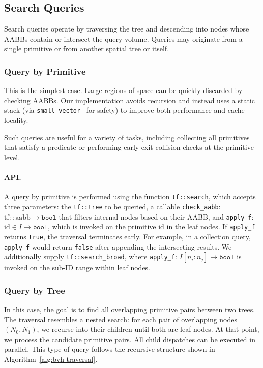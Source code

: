 \subsection{Search Queries}

Search queries operate by traversing the tree and descending
into nodes whose AABBs contain or intersect the query volume.
Queries may originate from a single primitive or from another
spatial tree or itself.

\subsubsection{Query by Primitive}
This is the simplest case. Large regions of space can be
quickly discarded by checking AABBs. Our implementation avoids
recursion and instead uses a static stack (via
\texttt{small\_vector}~\cite{llvm-small-vector} for safety) to
improve both performance and cache locality.

Such queries are useful for a variety of tasks, including
collecting all primitives that satisfy a predicate or
performing early-exit collision checks at the primitive level.

\paragraph*{API.}
A query by primitive is performed using the function
\texttt{tf::search}, which accepts three parameters:
the \texttt{tf::tree} to be queried, a callable
\texttt{check\_aabb}: $\mathrm{tf::aabb} \to \texttt{bool}$
that filters internal nodes based on their AABB,
and \texttt{apply\_f}: $\mathrm{id}\in I \to \texttt{bool}$,
which is invoked on the primitive id in the leaf nodes.
If \texttt{apply\_f} returns \texttt{true}, the traversal
terminates early. For example, in a collection query,
\texttt{apply\_f} would return \texttt{false} after
appending the intersecting results. We additionally
supply \texttt{tf::search\_broad}, where
\texttt{apply\_f}: $I[n_i:n_j] \to \texttt{bool}$
is invoked on the sub-ID range within leaf nodes.

	{\small }

\subsubsection{Query by Tree}
In this case, the goal is to find all overlapping primitive
pairs between two trees. The traversal resembles a nested
search: for each pair of overlapping nodes $(N_0, N_1)$,
we recurse into their children until both are leaf nodes.
At that point, we process the candidate primitive pairs.
All child dispatches can be executed in parallel.
This type of query follows the recursive structure shown in
Algorithm~\ref{alg:bvh-traversal}. 

